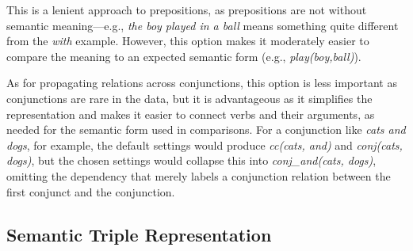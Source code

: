 This is a lenient approach to prepositions, as prepositions
are not without semantic meaning---e.g., \textit{the boy played in a
  ball} means something quite different from the \textit{with} example.  However, this option makes it moderately easier to compare the meaning to an expected semantic form (e.g., \textit{play(boy,ball)}).

As for propagating relations across conjunctions, this option is less important as conjunctions are rare in the data, but it is advantageous as it simplifies the representation and makes it easier to connect verbs and their arguments, as needed for the semantic form used in comparisons. For a conjunction like \textit{cats and dogs}, for example, the default settings would produce \textit{cc(cats, and)} and \textit{conj(cats, dogs)}, but the chosen settings would collapse this into \textit{conj\_and(cats, dogs)}, omitting the dependency that merely labels a conjunction relation between the first conjunct and the conjunction.


\subsection{Semantic Triple Representation}
\label{sec:semantic-form}
%

